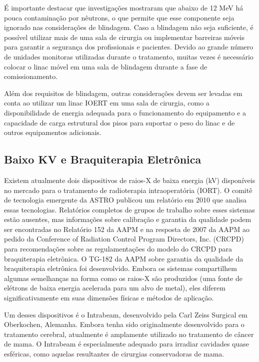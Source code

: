 \documentclass[11pt,a4paper]{article}
\begin{document}
	É importante destacar que investigações mostraram que abaixo de 12 MeV há pouca contaminação por nêutrons, o que permite que esse componente seja ignorado nas considerações de blindagem. Caso a blindagem não seja suficiente, é possível utilizar mais de uma sala de cirurgia ou implementar barreiras móveis para garantir a segurança dos profissionais e pacientes. Devido ao grande número de unidades monitoras utilizadas durante o tratamento, muitas vezes é necessário colocar o linac móvel em uma sala de blindagem durante a fase de comissionamento.

	Além dos requisitos de blindagem, outras considerações devem ser levadas em conta ao utilizar um linac IOERT em uma sala de cirurgia, como a disponibilidade de energia adequada para o funcionamento do equipamento e a capacidade de carga estrutural dos pisos para suportar o peso do linac e de outros equipamentos adicionais.


\subsection*{Baixo KV e Braquiterapia Eletrônica}

	Existem atualmente dois dispositivos de raios-X de baixa energia (kV) disponíveis no mercado para o tratamento de radioterapia intraoperatória (IORT). O comitê de tecnologia emergente da ASTRO publicou um relatório em 2010 que analisa essas tecnologias. Relatórios completos de grupos de trabalho sobre esses sistemas estão ausentes, mas informações sobre calibração e garantia da qualidade podem ser encontradas no Relatório 152 da AAPM e na resposta de 2007 da AAPM ao pedido da Conference of Radiation Control Program Directors, Inc. (CRCPD) para recomendações sobre as regulamentações do modelo do CRCPD para braquiterapia eletrônica. O TG-182 da AAPM sobre garantia da qualidade da braquiterapia eletrônica foi desenvolvido. Embora os sistemas compartilhem algumas semelhanças na forma como os raios-X são produzidos (uma fonte de elétrons de baixa energia acelerada para um alvo de metal), eles diferem significativamente em suas dimensões físicas e métodos de aplicação.
	
	
	Um desses dispositivos é o Intrabeam, desenvolvido pela Carl Zeiss Surgical em Oberkochen, Alemanha. Embora tenha sido originalmente desenvolvido para o tratamento cerebral, atualmente é amplamente utilizado no tratamento de câncer de mama. O Intrabeam é especialmente adequado para irradiar cavidades quase esféricas, como aquelas resultantes de cirurgias conservadoras de mama.
\end{document}
